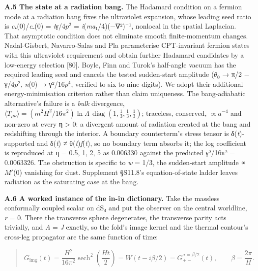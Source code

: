 \documentclass[
]{article}
\begin{document}
\textbf{A.5 The state at a radiation bang.} The Hadamard condition on a
fermion mode at a radiation bang fixes the ultraviolet expansion, whose
leading seed ratio is \emph{c}₊(0)/\emph{c}₋(0) = \emph{i}γ/4\(p^2\) =
\emph{i}(\emph{ma}₁/4)(−∇²)⁻¹, nonlocal in the spatial Laplacian. That
asymptotic condition does not eliminate smooth finite-momentum changes.
Nadal-Gisbert, Navarro-Salas and Pla parameterise CPT-invariant fermion
states with this ultraviolet requirement and obtain further Hadamard
candidates by a low-energy selection {[}80{]}. Boyle, Finn and Turok's
half-angle vacuum has the required leading seed and cancels the tested
sudden-start amplitude (\(\theta_0\) → π/2 − γ/4\(p^2\), \emph{n}(0) →
γ²/16\(p^4\), verified to six to nine digits). We adopt their additional
energy-minimisation criterion rather than claim uniqueness. The
bang-adiabatic alternative's failure is a \emph{bulk} divergence,
\(\langle T_{\mu\nu}\rangle=(m^2H^2/16\pi^2)\ln\Lambda\,
\operatorname{diag}(1,\tfrac13,\tfrac13,\tfrac13)\); traceless,
conserved, \(\propto a^{-4}\) and non-zero at every η \textgreater{} 0:
a divergent amount of radiation created at the bang and redshifting
through the interior. A boundary counterterm's stress tensor is
δ(\emph{t})-supported and δ(\emph{t}) ≠ θ(\emph{t})\emph{f}(\emph{t}),
so no boundary term absorbs it; the log coefficient is reproduced at η =
0.5, 1, 2, 5 as 0.006330 against the predicted γ²/16π² = 0.0063326. The
obstruction is specific to \emph{w} = 1/3, the sudden-start amplitude ∝
\(M'\)(0) vanishing for dust. Supplement §S11.8's equation-of-state
ladder leaves radiation as the saturating case at the bang.

\textbf{A.6 A worked instance of the in-in dictionary.} Take the
massless conformally coupled scalar on dS₄ and put the observer on the
central worldline, \emph{r} = 0. There the transverse sphere
degenerates, the transverse parity acts trivially, and \emph{A} =
\emph{J} exactly, so the fold's image kernel and the thermal contour's
cross-leg propagator are the same function of time:

\begin{quote}
\[
G_{\mathrm{img}}(t)=\frac{H^2}{16\pi^2}\operatorname{sech}^2\!\left(\frac{Ht}{2}\right)
=W(t-i\beta/2)=G_{+-}^{\sigma=\beta/2}(t),
\qquad \beta=\frac{2\pi}{H}.
\]
\end{quote}
\end{document}
